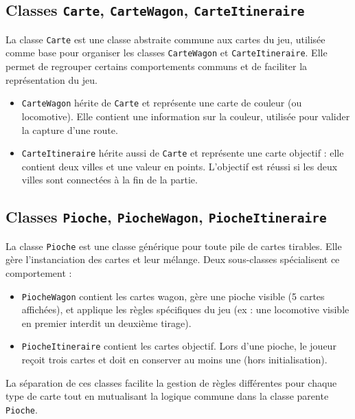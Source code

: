 \documentclass[a4paper,12pt]{report}
\begin{document}
\subsection*{Classes \texttt{Carte}, \texttt{CarteWagon}, \texttt{CarteItineraire}}

La classe \texttt{Carte} est une classe abstraite commune aux cartes du jeu, utilisée comme base pour organiser les
classes \texttt{CarteWagon} et \texttt{CarteItineraire}. Elle permet de regrouper certains comportements communs et de
faciliter la représentation du jeu.

\begin{itemize}
    \item \texttt{CarteWagon} hérite de \texttt{Carte} et représente une carte de couleur (ou locomotive).
    Elle contient une information sur la couleur, utilisée pour valider la capture d'une route.
    \item \texttt{CarteItineraire} hérite aussi de \texttt{Carte} et représente une carte objectif :
    elle contient deux villes et une valeur en points. L’objectif est réussi si les deux villes sont
    connectées à la fin de la partie.
\end{itemize}

\vspace{0.5em}

\subsection*{Classes \texttt{Pioche}, \texttt{PiocheWagon}, \texttt{PiocheItineraire}}

La classe \texttt{Pioche} est une classe générique pour toute pile de cartes tirables.
Elle gère l'instanciation des cartes et leur mélange.
Deux sous-classes spécialisent ce comportement :

\begin{itemize}
    \item \texttt{PiocheWagon} contient les cartes wagon, gère une pioche visible (5 cartes affichées),
    et applique les règles spécifiques du jeu (ex : une locomotive visible en premier interdit un deuxième tirage).
    \item \texttt{PiocheItineraire} contient les cartes objectif.
    Lors d’une pioche, le joueur reçoit trois cartes et doit en conserver au moins une (hors initialisation).
\end{itemize}

La séparation de ces classes facilite la gestion de règles différentes pour chaque type de carte tout en mutualisant
la logique commune dans la classe parente \texttt{Pioche}.
\end{document}
